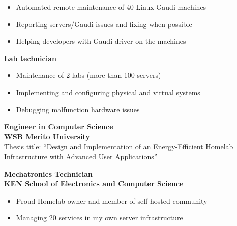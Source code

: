\documentclass[10pt,a4paper,ragged2e,withhyper]{altacv/altacv}
\begin{document}
\begin{paracol}{2}
\begin{itemize}
\item Automated remote maintenance of 40 Linux Gaudi machines
\item Reporting servers/Gaudi issues and fixing when possible
\item Helping developers with Gaudi driver on the machines
\end{itemize}

\medskip

\textbf{\textcolor{accent}{Lab technician}} \hfill {}
\smallskip

\begin{itemize}
\item Maintenance of 2 labs (more than 100 servers)
\item Implementing and configuring physical and virtual systems
\item Debugging malfunction hardware issues
\end{itemize}





\medskip


\large\textbf{Engineer in Computer Science} \normalsize \hfill {}\\
\textbf{\textcolor{accent}{WSB Merito University}} \hfill {}\\
\smallskip
Thesis title: “Design and Implementation of an Energy-Efficient Homelab Infrastructure with Advanced User Applications”

\divider

\large\textbf{Mechatronics Technician} \normalsize \hfill {}\\
\textbf{\textcolor{accent}{KEN School of Electronics and Computer Science}} \hfill {}\\
\smallskip



\begin{itemize}
\item Proud Homelab owner and member of self-hosted community
\item Managing 20 services in my own server infrastructure
\end{itemize}




\end{paracol}
\end{document}
